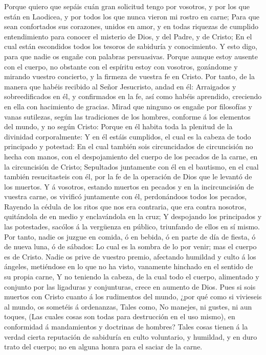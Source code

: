  Porque quiero que sepáis cuán gran solicitud tengo por
vosotros, y por los que están en Laodicea, y por todos los que nunca
vieron mi rostro en carne;  Para que sean confortados sus
corazones, unidos en amor, y en todas riquezas de cumplido entendimiento
para conocer el misterio de Dios, y del Padre, y de Cristo; 
En el cual están escondidos todos los tesoros de sabiduría y
conocimiento.  Y esto digo, para que nadie os engañe con
palabras persuasivas.  Porque aunque estoy ausente con el
cuerpo, no obstante con el espíritu estoy con vosotros, gozándome y
mirando vuestro concierto, y la firmeza de vuestra fe en Cristo.
 Por tanto, de la manera que habéis recibido al Señor
Jesucristo, andad en él:  Arraigados y sobreedificados en
él, y confirmados en la fe, así como habéis aprendido, creciendo en ella
con hacimiento de gracias.  Mirad que ninguno os engañe por
filosofías y vanas sutilezas, según las tradiciones de los hombres,
conforme á los elementos del mundo, y no según Cristo: 
Porque en él habita toda la plenitud de la divinidad corporalmente:
 Y en él estáis cumplidos, el cual es la cabeza de todo
principado y potestad:  En el cual también sois
circuncidados de circuncisión no hecha con manos, con el despojamiento
del cuerpo de los pecados de la carne, en la circuncisión de Cristo;
 Sepultados juntamente con él en el bautismo, en el cual
también resucitasteis con él, por la fe de la operación de Dios que le
levantó de los muertos.  Y á vosotros, estando muertos en
pecados y en la incircuncisión de vuestra carne, os vivificó juntamente
con él, perdonándoos todos los pecados,  Rayendo la cédula
de los ritos que nos era contraria, que era contra nosotros, quitándola
de en medio y enclavándola en la cruz;  Y despojando los
principados y las potestades, sacólos á la vergüenza en público,
triunfando de ellos en sí mismo.  Por tanto, nadie os
juzgue en comida, ó en bebida, ó en parte de día de fiesta, ó de nueva
luna, ó de sábados:  Lo cual es la sombra de lo por venir;
mas el cuerpo es de Cristo.  Nadie os prive de vuestro
premio, afectando humildad y culto á los ángeles, metiéndose en lo que
no ha visto, vanamente hinchado en el sentido de su propia carne,
 Y no teniendo la cabeza, de la cual todo el cuerpo,
alimentado y conjunto por las ligaduras y conjunturas, crece en aumento
de Dios.  Pues si sois muertos con Cristo cuanto á los
rudimentos del mundo, ¿por qué como si vivieseis al mundo, os sometéis á
ordenanzas,  Tales como, No manejes, ni gustes, ni aun
toques,  (Las cuales cosas son todas para destrucción en el
uso mismo), en conformidad á mandamientos y doctrinas de hombres?
 Tales cosas tienen á la verdad cierta reputación de
sabiduría en culto voluntario, y humildad, y en duro trato del cuerpo;
no en alguna honra para el saciar de la carne.

